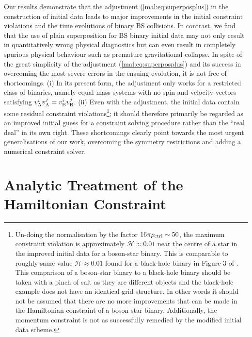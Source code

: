 Our results demonstrate that
the adjustment (\ref{mal:eq:superposplus}) in the construction of initial
data leads to major improvements in the initial constraint violations and the
time evolutions of binary BS collisions. In contrast, we find that the use of plain
superposition for BS binary initial data may not only result in quantitatively
wrong physical diagnostics but can even result in completely spurious physical behaviour
such as premature gravitational collapse. In spite of the great simplicity of the
adjustment (\ref{mal:eq:superposplus}) and its success in overcoming the most
severe errors in the ensuing evolution, it is not free of shortcomings.
(i) In its present form, the adjustment only works for a restricted class of
binaries, namely equal-mass systems with no spin and velocity vectors
satisfying $v_{\rm A}^i v_{\rm A}^j=v_{\rm B}^i v_{\rm B}^j$. (ii) Even with
the adjustment, the initial data contain some residual constraint violations\footnote{
Un-doing the normalisation by the factor $16 \pi \rho_{\rm ctrl} \sim 50$, the maximum
constraint violation is approximately $\mathcal{H} \approx 0.01$ near the centre
of a star in the improved initial data for a boson-star binary.
This is comparable to roughly same value $\mathcal{H} \approx 0.01$ found for
a black-hole binary in Figure 3 of \cite{Sperhake:2006cy}. This comparison of a
boson-star binary to a black-hole binary should be taken with a pinch of salt as they are
different objects and the black-hole example does not have an identical
grid structure. In other words it should not be assumed that there are no more improvements
that can be made in the Hamiltonian constraint of a boson-star binary. Additionally,
the momentum constraint is not as successfully remedied by the modified initial data scheme.
};
it should therefore primarily be regarded as an improved initial guess for
a constraint solving procedure rather than the ``real deal'' in its own right.
These shortcomings clearly point towards the most urgent generalisations of our
work, overcoming the symmetry restrictions and adding a numerical constraint
solver.



\section{Analytic Treatment of the Hamiltonian Constraint}
\label{mal:sec:hamanalytic}

